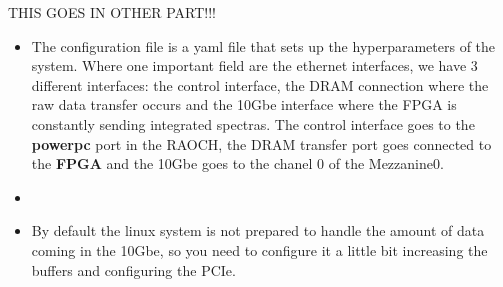 
THIS GOES IN OTHER PART!!!
\begin{itemize}
    \item The configuration file is a yaml file that sets up the hyperparameters of the system. Where one important field are the ethernet interfaces, we have 3 different interfaces: the control interface, the DRAM connection where the raw data transfer occurs  and the 10Gbe interface where the FPGA is constantly sending integrated spectras. The control interface goes to the \textbf{powerpc} port in the RAOCH, the DRAM transfer port goes connected to the \textbf{FPGA} and the 10Gbe goes to the chanel 0 of the Mezzanine0.
    \item
    \item By default the linux system is not prepared to handle the amount of data coming in the 10Gbe, so you need to configure it a little bit increasing the buffers and configuring the PCIe.
\end{itemize}
